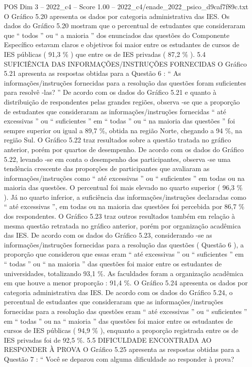 \begin{textsample}{POS Dim 3 – 2022\_c4 – Score 1.00 – 2022\_c4/enade\_2022\_psico\_d9caf7f89c.txt}
O Gráfico 5.20 apresenta os dados por categoria administrativa das IES.
Os dados do Gráfico 5.20 mostram que o percentual de estudantes que consideraram que “ todos ” ou “ a maioria ” dos enunciados das questões do Componente Específico estavam claros e objetivos foi maior entre os estudantes de cursos de IES públicas ( 91,3 \% ) que entre os de IES privadas ( 87,2 \% ). 5.4 SUFICIÊNCIA DAS INFORMAÇÕES/INSTRUÇÕES FORNECIDAS O Gráfico 5.21 apresenta as respostas obtidas para a Questão 6 : “ As informações/instruções fornecidas para a resolução das questões foram suficientes para resolvê -las? ” De acordo com os dados do Gráfico 5.21 e quanto à distribuição de respondentes pelas grandes regiões, observa -se que a proporção de estudantes que consideraram as informações/instruções fornecidas “ até excessivas ” ou “ suficientes ” em “ todas ” ou “ na maioria das questões ” foi sempre superior ou igual a 89,7 \%, obtida na região Norte, chegando a 94 \%, na região Sul.
O Gráfico 5.22 traz resultados sobre a questão tratada no gráfico anterior, porém por quartos de desempenho.
De acordo com os dados do Gráfico 5.22, levando -se em conta o desempenho dos participantes, observa -se uma tendência crescente das proporções de participantes que avaliaram as informações/instruções como “ até excessivas ” ou “ suficientes ” em todas ou na maioria das questões.
O percentual foi mais elevado no quarto superior ( 96,3 \% ).
Já no quarto inferior, a suficiência das informações/instruções declaradas como “ até excessivas ”, em todas ou na maioria das questões foi percebida por 86,7 \% dos respondentes.
O Gráfico 5.23 traz outros resultados também em relação à mesma questão retratada no gráfico anterior, porém por organização acadêmica das IES.
De acordo com os dados do Gráfico 5.23, considerando -se as informações/instruções fornecidas para a resolução das questões ( Questão 6 ), a proporção que considerou que essas eram “ até excessivas ” ou “ suficientes ” em “ todas ” ou “ na maioria ” das questões foi maior entre os estudantes de universidades, totalizando 93,1 \%.
As faculdades foram a organização acadêmica em que houve a menor proporção : 91,4 \%.
O Gráfico 5.24 apresenta os dados por categoria administrativa das IES.
De acordo com os dados do Gráfico 5.24, o percentual de estudantes que consideraram que as informações/instruções fornecidas para a resolução das questões eram “ até excessivas ” ou “ suficientes ” em “ todas ” ou na “ maioria ” das questões foi maior entre os estudantes de cursos de IES públicas ( 94,9 \% ), enquanto a proporção registrada entre os de IES privadas foi de 92,5 \%. 5.5 DIFICULDADE ENCONTRADA AO RESPONDER À PROVA O Gráfico 5.25 apresenta as respostas obtidas para a Questão 7 : “ Você se deparou com alguma dificuldade ao responder à prova?

\end{textsample}
